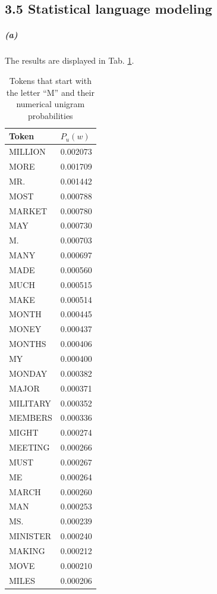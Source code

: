 \documentclass{article}
\begin{document}
\subsection*{3.5 Statistical language modeling}
\subparagraph*{(a)}
The results are displayed in Tab. \ref{3.5a}.
\begin{table}
	\centering
	\begin{tabular}{|p{4cm}|p{4cm}|}
		\hline
		Token & $P_u(w)$ \\
		\hline
		MILLION & 0.002073 \\
		\hline
		MORE & 0.001709 \\
		\hline
		MR. & 0.001442 \\
		\hline
		MOST & 0.000788 \\
		\hline
		MARKET & 0.000780 \\
		\hline
		MAY & 0.000730 \\
		\hline
		M. & 0.000703 \\
		\hline
		MANY & 0.000697 \\
		\hline
		MADE & 0.000560 \\
		\hline
		MUCH & 0.000515 \\
		\hline
		MAKE & 0.000514 \\
		\hline
		MONTH & 0.000445 \\
		\hline
		MONEY & 0.000437 \\
		\hline
		MONTHS & 0.000406 \\
		\hline
		MY & 0.000400 \\
		\hline
		MONDAY & 0.000382 \\
		\hline
		MAJOR & 0.000371 \\
		\hline
		MILITARY & 0.000352 \\
		\hline
		MEMBERS & 0.000336 \\
		\hline
		MIGHT & 0.000274 \\
		\hline
		MEETING & 0.000266 \\
		\hline
		MUST & 0.000267 \\
		\hline
		ME & 0.000264 \\
		\hline
		MARCH & 0.000260 \\
		\hline
		MAN & 0.000253 \\
		\hline
		MS. & 0.000239 \\
		\hline
		MINISTER & 0.000240 \\
		\hline
		MAKING & 0.000212 \\
		\hline
		MOVE & 0.000210 \\
		\hline
		MILES & 0.000206 \\
		\hline
	\end{tabular}
	\caption{Tokens that start with the letter “M” and their numerical unigram probabilities}
	\label{3.5a}
\end{table}
\end{document}
